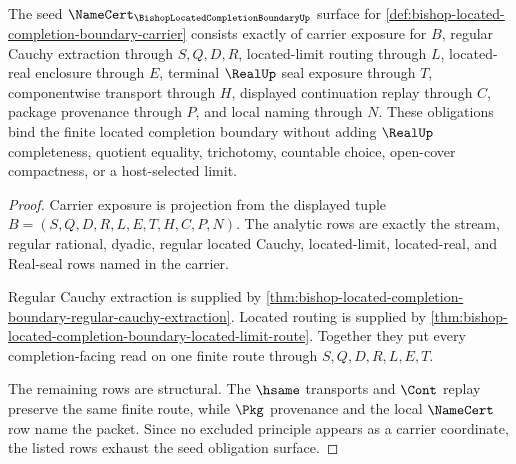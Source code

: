 \begin{theorem}
\label{thm:bishop-located-completion-boundary-namecert-obligations}
The seed $\NameCert_{\BishopLocatedCompletionBoundaryUp}$ surface for \autoref{def:bishop-located-completion-boundary-carrier} consists exactly of carrier exposure for $B$, regular Cauchy extraction through $S,Q,D,R$, located-limit routing through $L$, located-real enclosure through $E$, terminal $\RealUp$ seal exposure through $T$, componentwise transport through $H$, displayed continuation replay through $C$, package provenance through $P$, and local naming through $N$. These obligations bind the finite located completion boundary without adding $\RealUp$ completeness, quotient equality, trichotomy, countable choice, open-cover compactness, or a host-selected limit.
\end{theorem}
\begin{proof}
Carrier exposure is projection from the displayed tuple $B=(S,Q,D,R,L,E,T,H,C,P,N)$. The analytic rows are exactly the stream, regular rational, dyadic, regular located Cauchy, located-limit, located-real, and Real-seal rows named in the carrier.

Regular Cauchy extraction is supplied by \autoref{thm:bishop-located-completion-boundary-regular-cauchy-extraction}. Located routing is supplied by \autoref{thm:bishop-located-completion-boundary-located-limit-route}. Together they put every completion-facing read on one finite route through $S,Q,D,R,L,E,T$.

The remaining rows are structural. The $\hsame$ transports and $\Cont$ replay preserve the same finite route, while $\Pkg$ provenance and the local $\NameCert$ row name the packet. Since no excluded principle appears as a carrier coordinate, the listed rows exhaust the seed obligation surface.
\end{proof}

